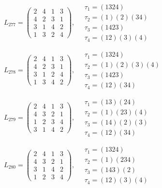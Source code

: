 $L_{277} = \begin{pmatrix} 2 & 4 & 1 & 3 \\ 4 & 2 & 3 & 1 \\ 3 & 1 & 4 & 2 \\ 1 & 3 & 2 & 4 \end{pmatrix}, \quad \begin{matrix} \tau_{1} = (1 3 2 4) \\ \tau_{2} = (1)(2)(3 4) \\ \tau_{3} = (1 4 2 3) \\ \tau_{4} = (1 2)(3)(4) \end{matrix}$

$L_{278} = \begin{pmatrix} 2 & 4 & 1 & 3 \\ 4 & 2 & 3 & 1 \\ 3 & 1 & 2 & 4 \\ 1 & 3 & 4 & 2 \end{pmatrix}, \quad \begin{matrix} \tau_{1} = (1 3 2 4) \\ \tau_{2} = (1)(2)(3)(4) \\ \tau_{3} = (1 4 2 3) \\ \tau_{4} = (1 2)(3 4) \end{matrix}$

$L_{279} = \begin{pmatrix} 2 & 4 & 1 & 3 \\ 4 & 3 & 2 & 1 \\ 1 & 2 & 3 & 4 \\ 3 & 1 & 4 & 2 \end{pmatrix}, \quad \begin{matrix} \tau_{1} = (1 3)(2 4) \\ \tau_{2} = (1)(2 3)(4) \\ \tau_{3} = (1 4)(2)(3) \\ \tau_{4} = (1 2)(3 4) \end{matrix}$

$L_{280} = \begin{pmatrix} 2 & 4 & 1 & 3 \\ 4 & 3 & 2 & 1 \\ 3 & 1 & 4 & 2 \\ 1 & 2 & 3 & 4 \end{pmatrix}, \quad \begin{matrix} \tau_{1} = (1 3 2 4) \\ \tau_{2} = (1)(2 3 4) \\ \tau_{3} = (1 4 3)(2) \\ \tau_{4} = (1 2)(3)(4) \end{matrix}$

